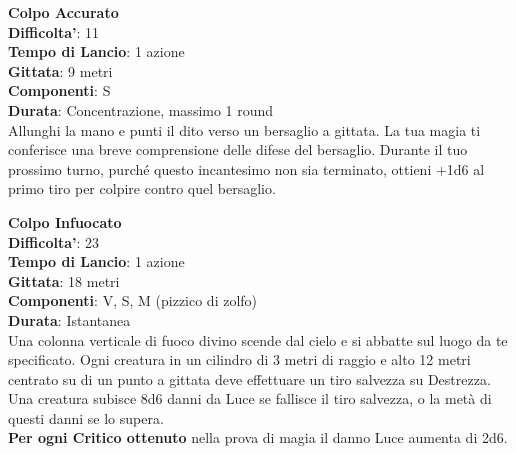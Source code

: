 \begin{multicols}{2}
\medskip\textbf{Colpo Accurato}\\
\textbf{Difficolta'}: 11\\
\textbf{Tempo di Lancio}: 1 azione\\
\textbf{Gittata}: 9 metri\\
\textbf{Componenti}: S\\
\textbf{Durata}: Concentrazione, massimo 1 round\\
Allunghi la mano e punti il dito verso un bersaglio a gittata. La tua magia ti conferisce una breve comprensione delle difese del bersaglio. Durante il tuo prossimo turno, purché questo incantesimo non sia terminato, ottieni +1d6 al primo tiro per colpire contro quel bersaglio.

\medskip\textbf{Colpo Infuocato}\\
\textbf{Difficolta'}: 23\\
\textbf{Tempo di Lancio}: 1 azione\\
\textbf{Gittata}: 18 metri\\
\textbf{Componenti}: V, S, M (pizzico di zolfo)\\
\textbf{Durata}: Istantanea\\
Una colonna verticale di fuoco divino scende dal cielo e si abbatte sul luogo da te specificato. Ogni creatura in un cilindro di 3 metri di raggio e alto 12 metri centrato su di un punto a gittata deve effettuare un tiro salvezza su Destrezza. Una creatura subisce 8d6 danni da Luce se fallisce il tiro salvezza, o la metà di questi danni se lo supera.\\
\textbf{Per ogni Critico ottenuto} nella prova di magia il danno Luce aumenta di 2d6.


\end{multicols}
